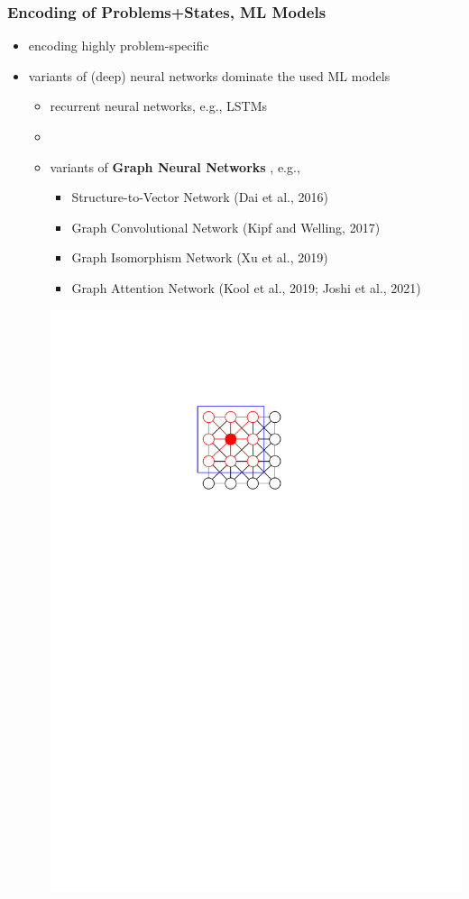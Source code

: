 \documentclass[aspectratio=1610]{beamer}
\newcommand{\important}[1]{{\color{green!60!black}#1}}
\begin{document}
\begin{frame}
	\frametitle{Encoding of Problems+States, ML Models}

	\begin{itemize}
		\itemsep3ex
		\item encoding highly problem-specific
		\item variants of (deep) neural networks dominate the used ML models
		\begin{itemize}
			\itemsep1.3ex
			\item recurrent neural networks, e.g., LSTMs
			\item {} \citep{vinyals-2015}
			\item variants of \important{\bf Graph Neural Networks} \citep{scarselli2008graph}, e.g.,
			\begin{itemize}
				\item Structure-to-Vector Network (Dai et al., 2016)
				\item Graph Convolutional Network (Kipf and Welling, 2017)
				\item Graph Isomorphism Network (Xu et al., 2019)
				\item Graph Attention Network (Kool et al., 2019; Joshi et al., 2021)
			\end{itemize}

			\medskip
			{\includegraphics[width=0.7\linewidth, page=3]{graphics/graphics.pdf}}\\[2ex]
		\end{itemize} 
	\end{itemize}
\end{frame}
\end{document}
